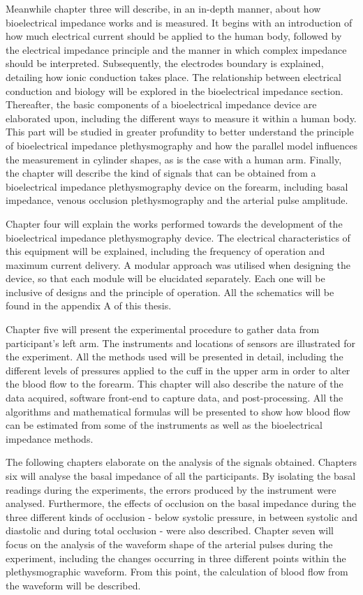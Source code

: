 Meanwhile chapter three will describe, in an in-depth manner, about how bioelectrical impedance works and is measured. It begins with an introduction of how much electrical current should be applied to the human body, followed by the electrical impedance principle and  the manner in which complex impedance should be interpreted. Subsequently, the electrodes boundary is explained, detailing how ionic conduction takes place. The relationship between electrical conduction and biology will be explored in the bioelectrical impedance section.  Thereafter, the basic components of a bioelectrical impedance device are elaborated upon, including the different ways to measure it within a human body. This part will be studied in greater profundity to better understand the principle of bioelectrical impedance plethysmography and how the parallel model influences the measurement in cylinder shapes, as is the case with a human arm. Finally, the chapter will describe the kind of signals that can be obtained from a bioelectrical impedance plethysmography device on the forearm, including basal impedance, venous occlusion plethysmography and the arterial pulse amplitude.

Chapter four will explain the works performed towards the development of the bioelectrical impedance plethysmography device. The electrical characteristics of this equipment will be explained, including the frequency of operation and maximum current delivery. A modular approach was utilised when designing the device, so that each module will be elucidated separately.  Each one will be inclusive of designs and the principle of operation. All the schematics will be found in the appendix A of this thesis. 

Chapter five will present the experimental procedure to gather data from participant's left arm. The instruments and locations of sensors are illustrated for the experiment. All the methods used will be presented in detail, including the different levels of pressures applied to the cuff in the upper arm in order to alter the blood flow to the forearm. This chapter will also describe the nature of the data acquired, software front-end to capture data, and post-processing. All the algorithms and mathematical formulas will be presented to show how blood flow can be estimated from some of the instruments as well as the bioelectrical impedance methods.  

The following chapters elaborate on the analysis of the signals obtained. Chapters six will analyse the basal impedance of all the participants. By isolating the basal readings during the experiments, the errors produced by the instrument were analysed. Furthermore, the effects of occlusion on the basal impedance during the three different kinds of occlusion - below systolic pressure, in between systolic and diastolic and during total occlusion - were also described. Chapter seven will focus on the analysis of the waveform shape of the arterial pulses during the experiment, including the changes occurring in three different points within the plethysmographic waveform. From this point, the calculation of blood flow from the waveform will be described. 

